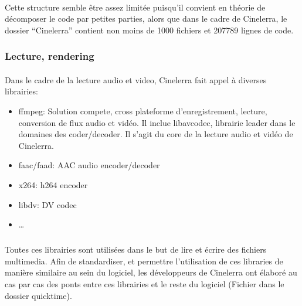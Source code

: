 \paragraph{}

Cette structure semble être assez limitée puisqu'il convient en théorie
de décomposer le code par petites parties, alors que dans le cadre de
Cinelerra, le dossier ``Cinelerra'' contient non  moins de 1000 fichiers
et 207789 lignes de code.

\subsubsection{Lecture, rendering}

\paragraph{}

Dans le cadre de la lecture audio et video, Cinelerra fait appel à
diverses librairies:

\begin{itemize}

  \item{ffmpeg: Solution compete, cross plateforme
  d'enregistrement, lecture, conversion de flux audio et vidéo. Il
  inclue libavcodec, librairie leader dans le domaines des
  coder/decoder.
Il s'agit du core de la
  lecture audio et vidéo de Cinelerra.}

  \item{faac/faad: AAC audio encoder/decoder}

  \item{x264: h264 encoder}

  \item{libdv: DV codec}

  \item{\ldots}

\end{itemize}

\subparagraph{}

Toutes ces librairies sont utilisées dans le but de lire et écrire des
fichiers multimedia. Afin de standardiser, et permettre l'utilisation de
ces libraries de manière similaire au sein du logiciel, les développeurs
de Cinelerra ont élaboré au cas par cas des ponts entre ces librairies
et le reste du logiciel (Fichier dans le dossier quicktime).

